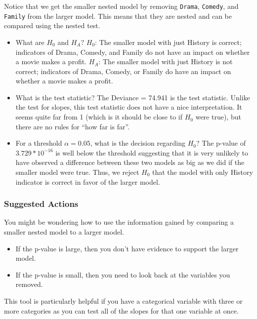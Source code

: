 \documentclass[
]{book}
\providecommand{\tightlist}{%
  \setlength{\itemsep}{0pt}\setlength{\parskip}{0pt}}
\begin{document}
Notice that we get the smaller nested model by removing \texttt{Drama}, \texttt{Comedy}, and \texttt{Family} from the larger model. This means that they are nested and can be compared using the nested test.

\begin{itemize}
\item
  What are \(H_0\) and \(H_A\)?
  \(H_0\): The smaller model with just History is correct; indicators of Drama, Comedy, and Family do not have an impact on whether a movie makes a profit.
  \(H_A\): The smaller model with just History is not correct; indicators of Drama, Comedy, or Family do have an impact on whether a movie makes a profit.
\item
  What is the test statistic?
  The Deviance = 74.941 is the test statistic. Unlike the test for slopes, this test statistic does not have a nice interpretation. It seems quite far from 1 (which is it should be close to if \(H_0\) were true), but there are no rules for ``how far is far''.
\item
  For a threshold \(\alpha = 0.05\), what is the decision regarding \(H_0\)?
  The p-value of \(3.729 * 10^{-16}\) is well below the threshold suggesting that it is very unlikely to have observed a difference between these two models as big as we did if the smaller model were true. Thus, we reject \(H_0\) that the model with only History indicator is correct in favor of the larger model.
\end{itemize}

\hypertarget{suggested-actions-1}{%
\subsubsection{Suggested Actions}\label{suggested-actions-1}}

You might be wondering how to use the information gained by comparing a smaller nested model to a larger model.

\begin{itemize}
\tightlist
\item
  If the p-value is large, then you don't have evidence to support the larger model.
\item
  If the p-value is small, then you need to look back at the variables you removed.
\end{itemize}

This tool is particularly helpful if you have a categorical variable with three or more categories as you can test all of the slopes for that one variable at once.
\end{document}
